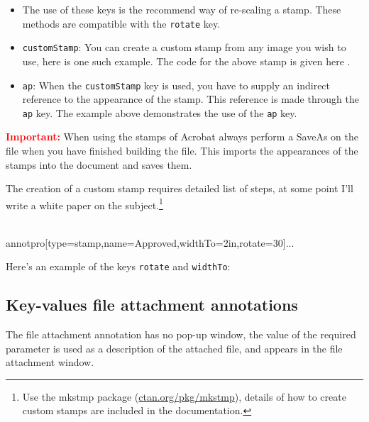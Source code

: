 \documentclass[12pt]{article}
\def\pkg{\textsf}
\let\app\textsf
\let\uif\textsf
\begin{document}
\begin{itemize}
\item[\textcolor{red}{\ding{043}}] The use of these keys is the recommend way of re-scaling
a stamp. These methods are compatible with the \texttt{rotate} key.

\item \texttt{customStamp}: You can create a custom stamp from any
    image you wish to use, here is
     one such
    example. The code for the above stamp is given here
    \annotpro{\annotstampv}.

\item \texttt{ap}: When the \texttt{\texttt{customStamp}} key is
    used, you have to supply an indirect reference to the appearance of
    the stamp. This reference is made through the \texttt{ap} key. The
    example above demonstrates the use of the \texttt{ap} key.
\end{itemize}
\textbf{\textcolor{red}{Important:}} When using the stamps of
\app{Acrobat} always perform a \uif{SaveAs} on the file when you have finished
building the file. This imports the appearances of the stamps into
the document and saves them.

\redpoint The creation of a custom stamp requires detailed list of steps, at
some point I'll write a white paper on the subject.\footnote{Use the \pkg{mkstmp} package
(\href{http://ctan.org/pkg/mkstmp}{ctan.org/pkg/mkstmp}),
details of how to create custom stamps are included in the documentation.}

\begin{defineJS}{\approvedStmp}
\\annotpro[type=stamp,name=Approved,widthTo=2in,rotate=30]{...}
\end{defineJS}

\newtopic
Here's an example of the keys \texttt{rotate} and \texttt{widthTo}:
\begin{center}
\end{center}

\subsection{Key-values file attachment annotations}

The file attachment annotation has no pop-up window, the value of the required parameter is used as a description
of the attached file, and appears in the file attachment window.
\end{document}

